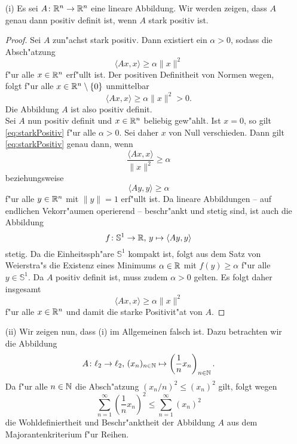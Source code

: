 
\begin{itemize}
\item[(i)]
Es sei $A\colon\mathbb{R}^n\to\mathbb{R}^n$ eine lineare Abbildung. Wir werden zeigen, dass
$A$ genau dann positiv definit ist, wenn $A$ stark positiv ist.

\begin{proof}
Sei $A$ zun"achst stark positiv. Dann existiert ein $\alpha>0$, sodass die
Absch"atzung
\begin{equation}\label{eq:starkPositiv}
\langle{Ax,x}\rangle \ge \alpha\lVert x\rVert^2
\end{equation}
f"ur alle $x\in\mathbb{R}^n$ erf"ullt ist. Der positiven Definitheit von Normen wegen,
folgt f"ur alle $x\in\mathbb{R}^n \setminus\{0\}$ unmittelbar
\[
\langle{Ax,x}\rangle \ge \alpha\lVert x\rVert^2 > 0.
\]
Die Abbildung $A$ ist also positiv definit.\\

Sei $A$ nun positiv definit und $x\in\mathbb{R}^n$ beliebig gew"ahlt. Ist $x=0$,
so gilt \eqref{eq:starkPositiv}
f"ur alle $\alpha>0$. Sei daher $x$ von Null verschieden. Dann gilt
\eqref{eq:starkPositiv} genau dann, wenn
\[
\frac{\langle Ax,x \rangle}{\lVert x \rVert^2} \ge \alpha
\]
beziehungsweise
\[
\langle Ay,y \rangle \ge \alpha
\]
f"ur alle $y\in\mathbb{R}^n$ mit $\lVert y \rVert = 1$ erf"ullt ist. Da lineare
Abbildungen -- auf endlichen Vekorr"aumen operierend -- beschr"ankt und
stetig sind, ist auch die Abbildung
\[
f\colon\mathbb{S}^1\to\mathbb{R} \text{, } y\mapsto\langle Ay,y\rangle
\]
stetig. Da die Einheitssph"are $\mathbb{S}^1$ kompakt ist, folgt aus dem
Satz von Weierstra"s die Existenz eines Minimums $\alpha\in\mathbb{R}$ mit
$f(y)\ge \alpha$ f"ur alle $y\in\mathbb{S}^1$. Da $A$ positiv definit ist,
muss zudem $\alpha>0$ gelten. Es folgt daher insgesamt
\[
\langle{Ax,x}\rangle \ge \alpha\lVert x\rVert^2
\]
f"ur alle $x\in\mathbb{R}^n$ und damit die starke Positivit"at von $A$.
\end{proof}

\item[(ii)]
Wir zeigen nun, dass (i) im Allgemeinen falsch ist. Dazu betrachten wir die
Abbildung
\[
A\colon \ell_2\to \ell_2 \text{, } (x_n)_{n\in\mathbb{N}} \mapsto
\left(\frac{1}{n}x_n\right)_{n\in\mathbb{N}}.
\]
Da f"ur alle $n\in\mathbb{N}$ die Absch"atzung $(x_n / n)^2 \le (x_n)^2$ gilt,
folgt wegen
\[
\sum_{n=1}^\infty \left(\frac{1}{n} x_n\right)^2 \le
\sum_{n=1}^\infty (x_n)^2
\]
die Wohldefiniertheit und Beschr"anktheit der Abbildung $A$ aus dem Majorantenkriterium f"ur Reihen.\\


\end{itemize}
